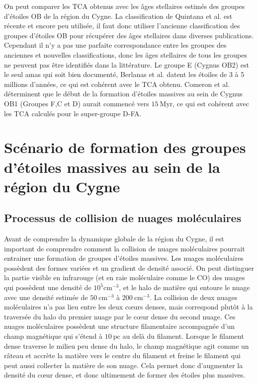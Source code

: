 \documentclass[a4paper, 11pt]{article}
\begin{document}
	On peut comparer les TCA obtenus avec les âges stellaires estimés des groupes d'étoiles OB de la région du Cygne. La classification de Quintana et al. \cite{quintana2021} est récente et encore peu utilisée, il faut donc utiliser l'ancienne classification des groupes d'étoiles OB pour récupérer des âges stellaires dans diverses publications. Cependant il n'y a pas une parfaite correspondance entre les groupes des anciennes et nouvelles classifications, donc les âges stellaires de tous les groupes ne peuvent pas être identifiés dans la littérature. Le groupe E (Cygnus OB2) est le seul amas qui soit bien documenté, Berlanas et al. \cite{berlanas2020} datent les étoiles de 3 à 5 millions d'années, ce qui est cohérent avec le TCA obtenu. Comeron et al. \cite{comeron2020} déterminent que le début de la formation d'étoiles massives au sein de Cygnus OB1 (Groupes F,C et D) aurait commencé vers $15 \ \mathrm{Myr}$, ce qui est cohérent avec les TCA calculés pour le super-groupe D-FA.
	
	\section{Scénario de formation des groupes d'étoiles massives au sein de la région du Cygne}
	\subsection{Processus de collision de nuages moléculaires}
	Avant de comprendre la dynamique globale de la région du Cygne, il est important de comprendre comment la collision de nuages moléculaires pourrait entrainer une formation de groupes d'étoiles massives. Les nuages moléculaires possèdent des formes variées et un gradient de densité associé. On peut distinguer la partie visible en infrarouge (et en raie moléculaire comme le CO) des nuages qui possèdent une densité de $10^5 \mathrm{cm^{-3}}$, et le halo de matière qui entoure le nuage avec une densité estimée de $50 \ \mathrm{cm^{-3}}$ à $200 \ \mathrm{cm^{-3}}$. La collision de deux nuages moléculaires n'a pas lieu entre les deux cœurs denses, mais correspond plutôt à la traversée du halo du premier nuage par le cœur dense du second nuage. Ces nuages moléculaires possèdent une structure filamentaire accompagnée d'un champ magnétique qui s'étend à $10 \ \mathrm{pc}$ au delà du filament. Lorsque le filament dense traverse le milieu peu dense du halo, le champ magnétique agit comme un râteau et accrète la matière vers le centre du filament et freine le filament qui peut aussi collecter la matière de son nuage. Cela permet donc d'augmenter la densité du cœur dense, et donc ultimement de former des étoiles plus massives.
	
\end{document}
